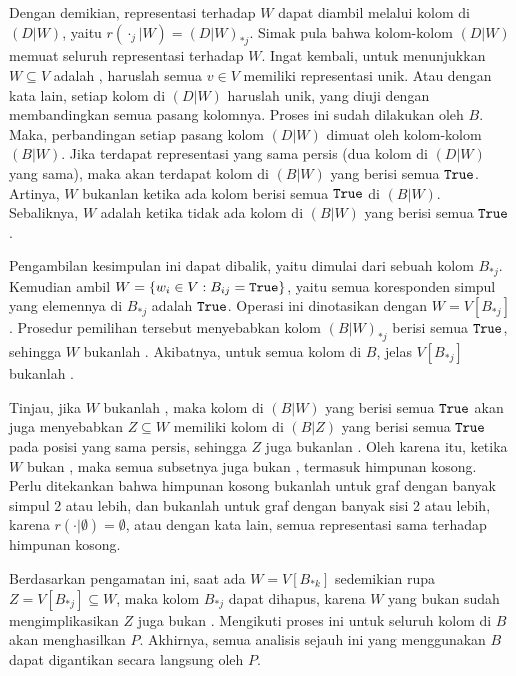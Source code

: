 Dengan demikian, representasi terhadap \(W\) dapat diambil melalui kolom di \((D|W)\), yaitu \(r(\cdot_j|W) = (D|W)_{*j}\). Simak pula bahwa kolom-kolom \((D|W)\) memuat seluruh representasi terhadap \(W\). Ingat kembali, untuk menunjukkan \(W \subseteq V\) adalah , haruslah semua \(v \in V\) memiliki representasi unik. Atau dengan kata lain, setiap kolom di \((D|W)\) haruslah unik, yang diuji dengan membandingkan semua pasang kolomnya. Proses ini sudah dilakukan oleh  \(B\). Maka, perbandingan setiap pasang kolom \((D|W)\) dimuat oleh kolom-kolom \((B|W)\). Jika terdapat representasi yang sama persis (dua kolom di \((D|W)\) yang sama), maka akan terdapat kolom di \((B|W)\) yang berisi semua \(\mathtt{True}\). Artinya, \(W\) bukanlan  ketika ada kolom berisi semua \(\mathtt{True}\) di \((B|W)\). Sebaliknya, \(W\) adalah  ketika tidak ada kolom di \((B|W)\) yang berisi semua \(\mathtt{True}\).

Pengambilan kesimpulan ini dapat dibalik, yaitu dimulai dari sebuah kolom \(B_{*j}\). Kemudian ambil \(W = \{w_i \in V : B_{ij} = \mathtt{True}\}\), yaitu semua koresponden simpul yang elemennya di \(B_{*j}\) adalah \(\mathtt{True}\). Operasi ini dinotasikan dengan \(W = V[B_{*j}]\). Prosedur pemilihan tersebut menyebabkan kolom \((B|W)_{*j}\) berisi semua \(\mathtt{True}\), sehingga \(W\) bukanlah . Akibatnya, untuk semua kolom di \(B\), jelas \(V[B_{*j}]\) bukanlah .

Tinjau, jika \(W\) bukanlah , maka kolom di \((B|W)\) yang berisi semua \(\mathtt{True}\) akan juga menyebabkan \(Z \subseteq W\) memiliki kolom di \((B|Z)\) yang berisi semua \(\mathtt{True}\) pada posisi yang sama persis, sehingga \(Z\) juga bukanlan . Oleh karena itu, ketika \(W\) bukan , maka semua subsetnya juga bukan , termasuk himpunan kosong. Perlu ditekankan bahwa himpunan kosong bukanlah  untuk graf dengan banyak simpul 2 atau lebih, dan bukanlah  untuk graf dengan banyak sisi 2 atau lebih, karena \(r(\cdot|\emptyset) = \emptyset\), atau dengan kata lain, semua representasi sama terhadap himpunan kosong.

Berdasarkan pengamatan ini, saat ada \(W = V[B_{*k}]\) sedemikian rupa \(Z = V[B_{*j}] \subseteq W\), maka kolom \(B_{*j}\) dapat dihapus, karena \(W\) yang bukan  sudah mengimplikasikan \(Z\) juga bukan . Mengikuti proses ini untuk seluruh kolom di \(B\) akan menghasilkan  \(P\). Akhirnya, semua analisis sejauh ini yang menggunakan \(B\) dapat digantikan secara langsung oleh \(P\).

